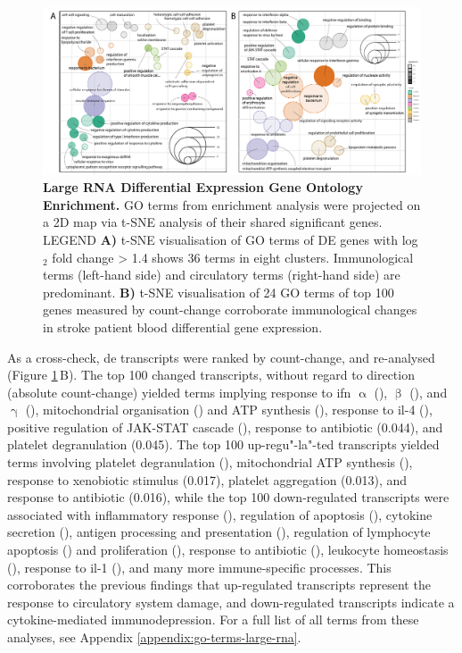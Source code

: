 \begin{figure}
\includegraphics[width=\textwidth]{figures/gsoap-de}
\caption[Large RNA Differential Expression Gene Ontology Enrichment.]{\textbf{Large RNA Differential Expression Gene Ontology Enrichment.} GO terms from enrichment analysis were projected on a 2D map via t-SNE analysis of their shared significant genes. LEGEND \textbf{A)} t-SNE visualisation of GO terms of DE genes with log$_2$ fold change > 1.4 shows 36 terms in eight clusters. Immunological terms (left-hand side) and circulatory terms (right-hand side) are predominant. \textbf{B)} t-SNE visualisation of 24 GO terms of top 100 genes measured by count-change corroborate immunological changes in stroke patient blood differential gene expression.
\label{fig:gsoap-de}}
\end{figure}

As a cross-check, \ac{de} transcripts were ranked by count-change, and re-analysed (Figure \ref{fig:gsoap-de}\,B). The top 100 changed transcripts, without regard to direction (absolute count-change) yielded terms implying response to \ac{ifn} $\upalpha$ (), $\upbeta$ (), and $\upgamma$ (), mitochondrial organisation () and ATP synthesis (), response to \ac{il}-4 (), positive regulation of JAK-STAT cascade (), response to antibiotic (0.044), and platelet degranulation (0.045). The top 100 up-regu"-la"-ted transcripts yielded terms involving platelet degranulation (), mitochondrial ATP synthesis (), response to xenobiotic stimulus (0.017), platelet aggregation (0.013), and response to antibiotic (0.016), while the top 100 down-regulated transcripts were associated with inflammatory response (), regulation of apoptosis (), cytokine secretion (), antigen processing and presentation (), regulation of lymphocyte apoptosis () and proliferation (), response to antibiotic (), leukocyte homeostasis (), response to \ac{il}-1 (), and many more immune-specific processes. This corroborates the previous findings that up-regulated transcripts represent the response to circulatory system damage, and down-regulated transcripts indicate a cytokine-mediated immunodepression. For a full list of all terms from these analyses, see Appendix \ref{appendix:go-terms-large-rna}. 

